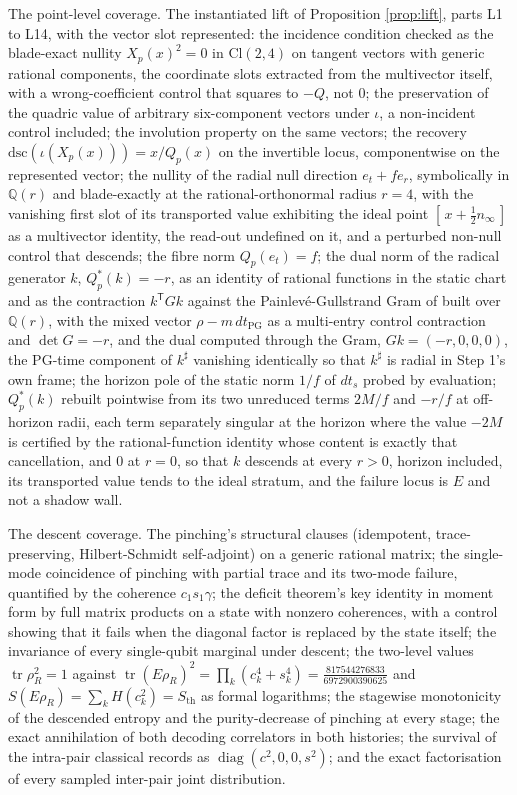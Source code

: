 \documentclass[11pt]{article}
\theoremstyle{definition}
\newcommand{\Cl}{\mathrm{Cl}}
\newcommand{\er}{e_r}
\newcommand{\et}{e_t}
\newcommand{\Sth}{S_{\mathrm{th}}}
\newcommand{\tr}{\operatorname{tr}}
\newcommand{\nInf}{n_\infty}
\newcommand{\dsc}{\mathrm{dsc}}
\begin{document}
The point-level coverage. The instantiated lift of Proposition \ref{prop:lift}, parts L1 to L14, with the vector slot represented: the incidence condition checked as the blade-exact nullity $X_p(x)^{2} = 0$ in $\Cl(2,4)$ on tangent vectors with generic rational components, the coordinate slots extracted from the multivector itself, with a wrong-coefficient control that squares to $-Q$, not $0$; the preservation of the quadric value of arbitrary six-component vectors under $\iota$, a non-incident control included; the involution property on the same vectors; the recovery $\dsc(\iota(X_p(x))) = x/Q_p(x)$ on the invertible locus, componentwise on the represented vector; the nullity of the radial null direction $\et + f\er$, symbolically in $\mathbb{Q}(r)$ and blade-exactly at the rational-orthonormal radius $r = 4$, with the vanishing first slot of its transported value exhibiting the ideal point $[\,x + \tfrac12\nInf\,]$ as a multivector identity, the read-out undefined on it, and a perturbed non-null control that descends; the fibre norm $Q_p(\et) = f$; the dual norm of the radical generator $k$, $Q^*_p(k) = -r$, as an identity of rational functions in the static chart and as the contraction $k^{\mathsf T}Gk$ against the Painlev\'e-Gullstrand Gram of \cite[Thm.~8.7]{ButlerT4} built over $\mathbb{Q}(r)$, with the mixed vector $\rho - m\,dt_{\mathrm{PG}}$ as a multi-entry control contraction and $\det G = -r$, and the dual computed through the Gram, $Gk = (-r, 0, 0, 0)$, the PG-time component of $k^{\sharp}$ vanishing identically so that $k^{\sharp}$ is radial in Step 1's own frame; the horizon pole of the static norm $1/f$ of $dt_s$ probed by evaluation; $Q^*_p(k)$ rebuilt pointwise from its two unreduced terms $2M/f$ and $-r/f$ at off-horizon radii, each term separately singular at the horizon where the value $-2M$ is certified by the rational-function identity whose content is exactly that cancellation, and $0$ at $r = 0$, so that $k$ descends at every $r > 0$, horizon included, its transported value tends to the ideal stratum, and the failure locus is $E$ and not a shadow wall.

The descent coverage. The pinching's structural clauses (idempotent, trace-preserving, Hilbert-Schmidt self-adjoint) on a generic rational matrix; the single-mode coincidence of pinching with partial trace and its two-mode failure, quantified by the coherence $c_1 s_1 \gamma$; the deficit theorem's key identity in moment form by full matrix products on a state with nonzero coherences, with a control showing that it fails when the diagonal factor is replaced by the state itself; the invariance of every single-qubit marginal under descent; the two-level values $\tr\rho_R^2 = 1$ against $\tr(E\rho_R)^2 = \prod_k(c_k^4 + s_k^4) = \tfrac{817544276833}{6972900390625}$ and $S(E\rho_R) = \sum_k H(c_k^{2}) = \Sth$ as formal logarithms; the stagewise monotonicity of the descended entropy and the purity-decrease of pinching at every stage; the exact annihilation of both decoding correlators in both histories; the survival of the intra-pair classical records as $\operatorname{diag}(c^2, 0, 0, s^2)$; and the exact factorisation of every sampled inter-pair joint distribution.
\end{document}
